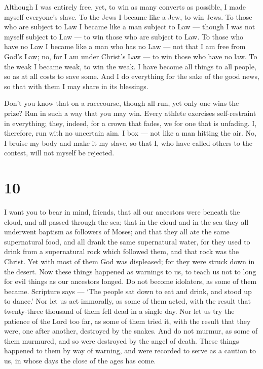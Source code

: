  Although I was entirely free, yet, to win as many converts
as possible, I made myself everyone's slave.  To the Jews I
became like a Jew, to win Jews. To those who are subject to Law I became
like a man subject to Law --- though I was not myself subject to Law ---
to win those who are subject to Law.  To those who have no
Law I became like a man who has no Law --- not that I am free from God's
Law; no, for I am under Christ's Law --- to win those who have no law.
 To the weak I became weak, to win the weak. I have become
all things to all people, so as at all costs to save some. 
And I do everything for the sake of the good news, so that with them I
may share in its blessings.

 Don't you know that on a racecourse, though all run, yet
only one wins the prize? Run in such a way that you may win.
 Every athlete exercises self-restraint in everything;
they, indeed, for a crown that fades, we for one that is unfading.
 I, therefore, run with no uncertain aim. I box --- not
like a man hitting the air.  No, I bruise my body and make
it my slave, so that I, who have called others to the contest, will not
myself be rejected.

\hypertarget{section-9}{%
\section{10}\label{section-9}}

 I want you to bear in mind, friends, that all our ancestors
were beneath the cloud, and all passed through the sea; 
that in the cloud and in the sea they all underwent baptism as followers
of Moses;  and that they all ate the same supernatural food,
 and all drank the same supernatural water, for they used to
drink from a supernatural rock which followed them, and that rock was
the Christ.  Yet with most of them God was displeased; for
they were struck down in the desert.  Now these things
happened as warnings to us, to teach us not to long for evil things as
our ancestors longed.  Do not become idolaters, as some of
them became. Scripture says --- `The people sat down to eat and drink,
and stood up to dance.'  Nor let us act immorally, as some
of them acted, with the result that twenty-three thousand of them fell
dead in a single day.  Nor let us try the patience of the
Lord too far, as some of them tried it, with the result that they were,
one after another, destroyed by the snakes.  And do not
murmur, as some of them murmured, and so were destroyed by the angel of
death.  These things happened to them by way of warning,
and were recorded to serve as a caution to us, in whose days the close
of the ages has come.

